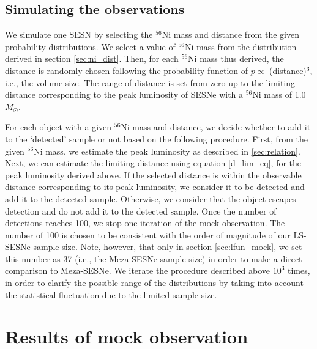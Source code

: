 \documentclass[twocolumn, linenumbers]{aastex62}
\begin{document}
\subsection{Simulating the observations}
We simulate one SESN by selecting the $^{56}$Ni mass and distance from the given probability distributions. We select a value of $^{56}$Ni mass from the distribution derived in section \ref{sec:ni_dist}. Then, for each $^{56}$Ni mass thus derived, the distance is randomly chosen following the probability function of $p \propto$ (distance)$^3$, i.e., the volume size. The range of distance is set from zero up to the limiting distance corresponding to the peak luminosity of SESNe with a $^{56}$Ni mass of 1.0$M_{\odot}$.

For each object with a given $^{56}$Ni mass and distance, we decide whether to add it to the `detected' sample or not based on the following procedure. First, from the given $^{56}$Ni mass, we estimate the peak luminosity as described in \ref{sec:relation}. Next, we can estimate the limiting distance using equation \ref{d_lim_eq}, for the peak luminosity derived above. 
If the selected distance is within the observable distance corresponding to its peak luminosity, we consider it to be detected and add it to the detected sample. Otherwise, we consider that the object escapes detection and do not add it to the detected sample. Once the number of detections reaches 100, we stop one iteration of the mock observation. The number of 100 is chosen to be consistent with the order of magnitude of our LS-SESNe sample size. Note, however, that only in section \ref{sec:lfun_mock}, we set this number as 37 (i.e., the Meza-SESNe sample size) in order to make a direct comparison to Meza-SESNe. We iterate the procedure described above $10^3$ times, in order to clarify the possible range of the distributions by taking into account the statistical fluctuation due to the limited sample size.

\section{Results of mock observation} \label{sec:mock_result}
\end{document}
